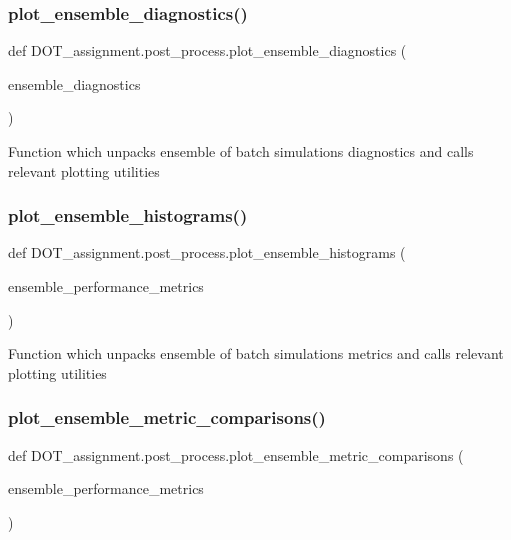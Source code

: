 \subsubsection{\texorpdfstring{plot\_ensemble\_diagnostics()}{plot\_ensemble\_diagnostics()}}
{\footnotesize\ttfamily def D\+O\+T\+\_\+assignment.\+post\+\_\+process.\+plot\+\_\+ensemble\+\_\+diagnostics (\begin{DoxyParamCaption}\item[{}]{ensemble\+\_\+diagnostics }\end{DoxyParamCaption})}

\begin{DoxyVerb}Function which unpacks ensemble of batch simulations diagnostics and calls relevant plotting utilities
\end{DoxyVerb}
 \mbox{\label{namespace_d_o_t__assignment_1_1post__process_a1e8346306e97b9ab19b9bd682c3ddcd7}} 
\subsubsection{\texorpdfstring{plot\_ensemble\_histograms()}{plot\_ensemble\_histograms()}}
{\footnotesize\ttfamily def D\+O\+T\+\_\+assignment.\+post\+\_\+process.\+plot\+\_\+ensemble\+\_\+histograms (\begin{DoxyParamCaption}\item[{}]{ensemble\+\_\+performance\+\_\+metrics }\end{DoxyParamCaption})}

\begin{DoxyVerb}Function which unpacks ensemble of batch simulations metrics and calls relevant plotting utilities
\end{DoxyVerb}
 \mbox{\label{namespace_d_o_t__assignment_1_1post__process_a00d9169a5cfaaade92ec1bfdb2483216}} 
\subsubsection{\texorpdfstring{plot\_ensemble\_metric\_comparisons()}{plot\_ensemble\_metric\_comparisons()}}
{\footnotesize\ttfamily def D\+O\+T\+\_\+assignment.\+post\+\_\+process.\+plot\+\_\+ensemble\+\_\+metric\+\_\+comparisons (\begin{DoxyParamCaption}\item[{}]{ensemble\+\_\+performance\+\_\+metrics }\end{DoxyParamCaption})}

